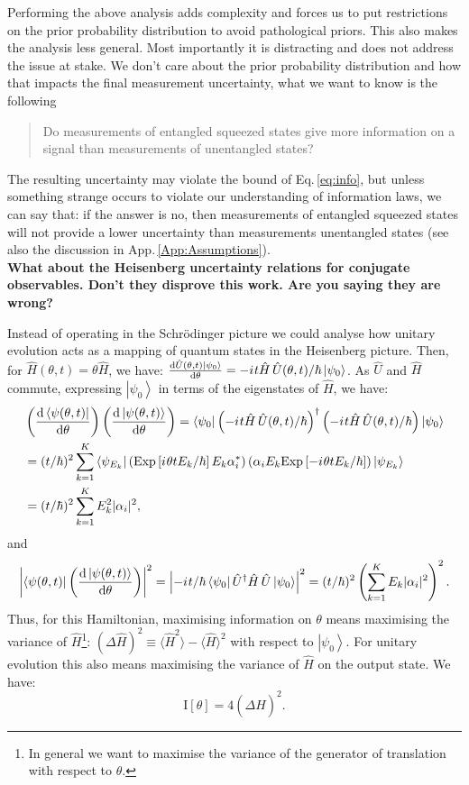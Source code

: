 \documentclass[reqno]{amsart}
\newcommand{\ket}[1]{\left| #1 \right>}
\newcommand{\bra}[1]{\left< #1 \right|}
\newcommand{\hham}{\hat{H}}
\newcommand{\U}{\hat{U}}
\newcommand{\iu}{{i\mkern1mu}}
\def\func#1#2{\mathrm{#1}\left[#2\right]}
\begin{document}
Performing the above analysis adds complexity and forces us to put restrictions on the prior probability distribution to avoid pathological priors. This also makes the analysis less general. Most importantly it is distracting and does not address the issue at stake. We don't care about the prior probability distribution and how that impacts the final measurement uncertainty, what we want to know is the following
\begin{quotation}
Do measurements of entangled squeezed states give more information on a signal than measurements of unentangled states?
\end{quotation}
The resulting uncertainty may violate the bound of Eq.\,\eqref{eq:info}, but unless something strange occurs to violate our understanding of information laws, we can say that:
if the answer is no, then measurements of entangled squeezed states will not provide a lower uncertainty than measurements unentangled states (see also the discussion in App.\,\ref{App:Assumptions}).\\

\textbf{What about the Heisenberg uncertainty relations for conjugate observables. Don't they disprove this work. Are you saying they are wrong?}

Instead of operating in the Schr\"odinger picture we could analyse how unitary evolution acts as a mapping of quantum states in the Heisenberg picture. Then, for $\hham(\theta, t) = \theta \hham$, we have: $\frac{\mathrm{d} \U(\theta,t)\ket{\psi_0}}{\mathrm{d}\theta} = -\iu t \hham \, \U(\theta, t)/\hbar \ket{\psi_0}$. As $\U$ and $\hham$ commute, expressing $\ket{\psi_0}$ in terms of the eigenstates of $\hham$, we have:
\[
\begin{split}
& \left(\frac{\mathrm{d}\bra{\psi(\theta,t)}}{\mathrm{d} \theta}\right)\left(\frac{\mathrm{d}\ket{\psi(\theta,t)}}{\mathrm{d} \theta}\right) = \bra{\psi_0}\left(-\iu t \hham \, \U(\theta,t)/\hbar\right)^{\dagger}\left(-\iu t \hham \, \U(\theta,t)/\hbar\right)\ket{\psi_0} \\
& = (t/\hbar)^2 \sum_{k = 1}^K \bra{\psi_{E_k}} \left(\func{Exp}{\iu \theta t E_k/\hbar}E_k \alpha_i^{\ast}\right)\left(\alpha_i E_k\func{Exp}{-\iu \theta t E_k/\hbar}\right) \ket{\psi_{E_k}}\\
& = (t/\hbar)^2 \sum_{k = 1}^K  E_k^2 |\alpha_i|^2,\\
\end{split}
\]
and
\[ \left|\bra{\psi(\theta,t)}\left(\frac{\mathrm{d}\ket{\psi(\theta,t)}}{\mathrm{d} \theta}\right)\right|^2 = \left|-\iu t/\hbar \bra{\psi_0}\U^{\dagger} \hham \,\U\ket{\psi_0}\right|^2 = (t/\hbar)^2\left(\sum_{k = 1}^K  E_k |\alpha_i|^2\right)^2.\]
Thus, for this Hamiltonian, maximising information on $\theta$ means maximising the variance of $\hham$\footnote{In general we want to maximise the variance of the generator of translation with respect to $\theta$.}: $(\Delta \hham)^2 \equiv \langle \hham^2 \rangle - \langle \hham \rangle^2$ with respect to $\ket{\psi_0}$. For unitary evolution this also means maximising the variance of $\hham$ on the output state. We have:
\[ \func{I}{\theta} = 4\left(\Delta \hham\right)^2.\]
\end{document}
